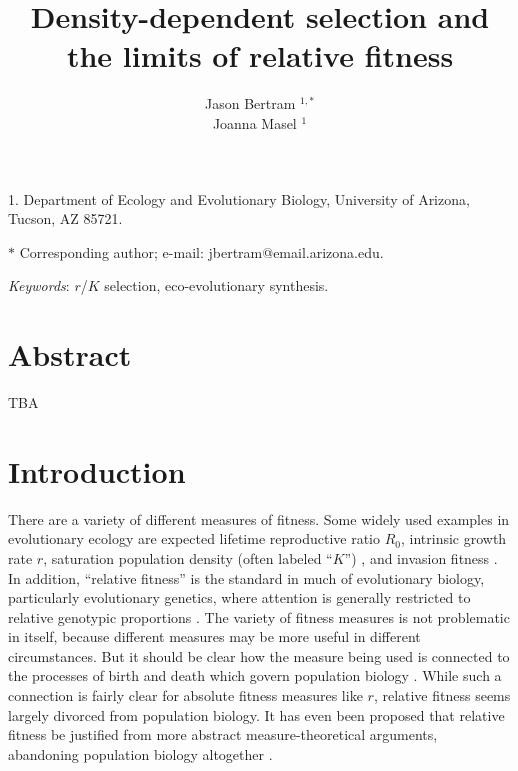 \documentclass[11pt]{article}
\title{Density-dependent selection and the limits of relative fitness}
\author{Jason Bertram $^{1,\ast}$ \\ 
Joanna Masel $^{1}$}
\date{}
\begin{document}
\maketitle

\noindent{}1. Department of Ecology and Evolutionary Biology, University of Arizona, Tucson, AZ 85721.

\noindent{}$\ast$ Corresponding author; e-mail: jbertram@email.arizona.edu.


\bigskip


\bigskip

\textit{Keywords}: $r$/$K$ selection, eco-evolutionary synthesis.

\bigskip


\linenumbers{}
\modulolinenumbers[1]

\newpage{}

\section*{Abstract}

TBA

\newpage{}


\section*{Introduction}

There are a variety of different measures of fitness. Some widely used examples in evolutionary ecology are expected lifetime reproductive ratio $R_0$, intrinsic growth rate $r$, saturation population density (often labeled ``$K$'') \citep{benton_2000}, and invasion fitness \citep{metz_1992}. In addition, ``relative fitness'' is the standard in much of evolutionary biology, particularly evolutionary genetics, where attention is generally restricted to relative genotypic proportions \cite[pp. 468]{barton_2007}. The variety of fitness measures is not problematic in itself, because different measures  may be more useful in different circumstances. But it should be clear how the measure being used is connected to the processes of birth and death which govern population biology \citep{metcalf_2007,doebeli_2017}. While such a connection is fairly clear for absolute fitness measures like $r$, relative fitness seems largely divorced from population biology. It has even been proposed that relative fitness be justified from more abstract measure-theoretical arguments, abandoning population biology altogether \citep{wagner_2010}.
\end{document}

